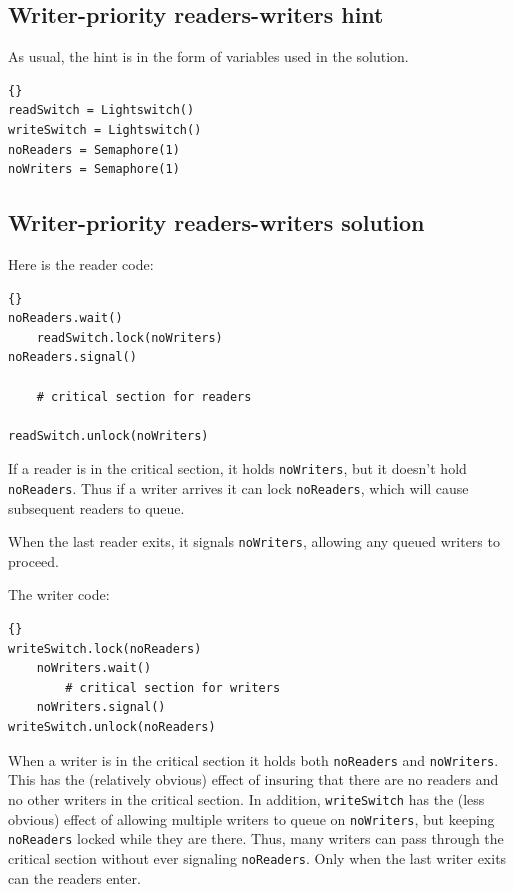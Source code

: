 \documentclass{book}
\newcommand{\clearemptydoublepage}{\newpage\cleardoublepage}
\begin{document}
\clearemptydoublepage
\subsection{Writer-priority readers-writers hint}

As usual, the hint is in the form of variables
used in the solution.

\begin{lstlisting}[title={Writer-priority readers-writers initialization}]{}
readSwitch = Lightswitch()
writeSwitch = Lightswitch()
noReaders = Semaphore(1)
noWriters = Semaphore(1)
\end{lstlisting}


\clearemptydoublepage
\subsection{Writer-priority readers-writers solution}

Here is the reader code:

\begin{lstlisting}[title={Writer-priority reader solution}]{}
noReaders.wait()
    readSwitch.lock(noWriters)
noReaders.signal()

    # critical section for readers

readSwitch.unlock(noWriters)
\end{lstlisting}

If a reader is in the critical section, it holds
{\tt noWriters}, but it doesn't hold {\tt noReaders}.
Thus if a writer arrives it can lock {\tt noReaders},
which will cause subsequent readers to queue.

When the last reader exits, it signals {\tt noWriters},
allowing any queued writers to proceed.

The writer code:

\begin{lstlisting}[title={Writer-priority writer solution}]{}
writeSwitch.lock(noReaders)
    noWriters.wait()
        # critical section for writers
    noWriters.signal()
writeSwitch.unlock(noReaders)
\end{lstlisting}

When a writer is in the critical section it holds both
{\tt noReaders} and {\tt noWriters}.  This has the
(relatively obvious) effect of insuring that there are
no readers and no other writers in the critical section.
In addition, {\tt writeSwitch} has the (less obvious) effect of
allowing multiple writers to queue on {\tt noWriters},
but keeping {\tt noReaders} locked while they are
there.  Thus, many writers can pass through the critical
section without ever signaling
{\tt noReaders}.  Only when the last writer exits can
the readers enter.
\end{document}
